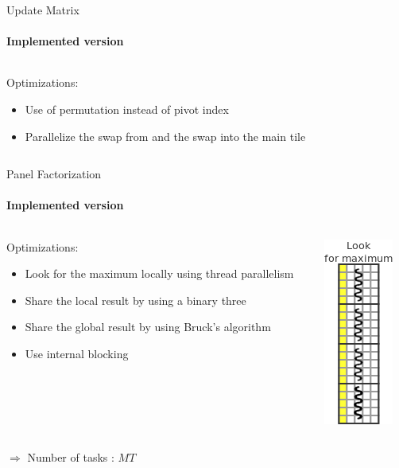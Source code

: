 \documentclass{beamer}
\begin{document}
\begin{frame}{Update Matrix}
\framesubtitle{Implemented version}
\begin{columns}
\begin{column}{.50\textwidth}
Optimizations:
\begin{itemize}
\item Use of permutation instead of pivot index
\item Parallelize the swap from and the swap into the main tile
\end{itemize}
\end{column}
\hfill
\begin{column}{.50\textwidth}
\end{column}
\end{columns}
\end{frame}

\begin{frame}{Panel Factorization}
\framesubtitle{Implemented version}
\begin{columns}
\begin{column}{.70\textwidth}
Optimizations:
\begin{itemize}
\item Look for the maximum locally using thread parallelism
\item Share the local result by using a binary three
\item Share the global result by using Bruck's algorithm
\item Use internal blocking
\end{itemize}
\end{column}
\hfill
\begin{column}{.30\textwidth}
\begin{center}
\includegraphics[scale=0.8]{panel_max_opt1.png}
\end{center}
\end{column}
\end{columns}
\pause
\begin{exampleblock}{}
$\Longrightarrow$ Number of tasks : $MT$
\end{exampleblock}{}
\end{frame}
\end{document}

